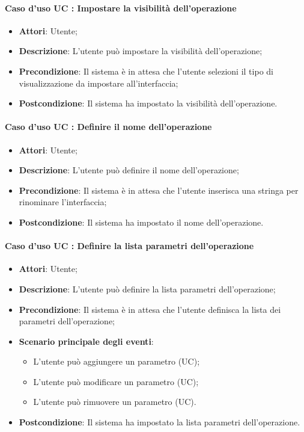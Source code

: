\documentclass[../AnalisiDeiRequisiti.tex]{subfiles}
\begin{document}
		\paragraph{Caso d'uso UC : Impostare la visibilità dell'operazione}
			\begin{itemize}
				\item \textbf{Attori}: Utente;
				\item \textbf{Descrizione}: L'utente può impostare la visibilità
				dell'operazione;
				\item \textbf{Precondizione}: Il sistema è in attesa che l'utente selezioni il
				tipo di visualizzazione da impostare all'interfaccia;
				\item \textbf{Postcondizione}: Il sistema ha impostato la visibilità
				dell'operazione.
			\end{itemize}
		\paragraph{Caso d'uso UC : Definire il nome dell'operazione}
			\begin{itemize}
				\item \textbf{Attori}: Utente;
				\item \textbf{Descrizione}: L'utente può definire il nome dell'operazione;
				\item \textbf{Precondizione}: Il sistema è in attesa che l'utente inserisca
				una stringa per rinominare l'interfaccia;
				\item \textbf{Postcondizione}: Il sistema ha impostato il nome
				dell'operazione.
			\end{itemize}
		\paragraph{Caso d'uso UC : Definire la lista parametri dell'operazione}
			\begin{itemize}
				\item \textbf{Attori}: Utente;
				\item \textbf{Descrizione}: L'utente può definire la lista parametri
				dell'operazione;
				\item \textbf{Precondizione}: Il sistema è in attesa che l'utente definisca
				la lista dei parametri dell'operazione;
				\item \textbf{Scenario principale degli eventi}:
					\begin{itemize}
						\item L'utente può aggiungere un parametro (UC);
						\item L'utente può modificare un parametro (UC);
						\item L'utente può rimuovere un parametro (UC).
					\end{itemize}
				\item \textbf{Postcondizione}: Il sistema ha impostato la lista parametri
				dell'operazione.
			\end{itemize}
\end{document}
